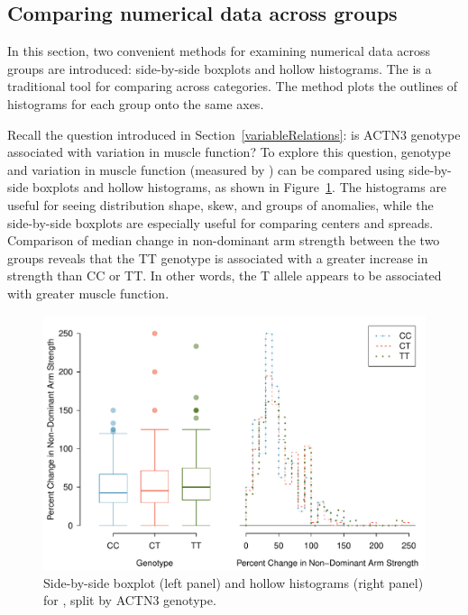 \subsection{Comparing numerical data across groups}
\label{comparingAcrossGroups}
In this section, two convenient methods for examining numerical data across groups are introduced: side-by-side boxplots and hollow histograms. The   is a traditional tool for comparing across categories. The  method plots the outlines of histograms for each group onto the same axes.

Recall the question introduced in Section~\ref{variableRelations}: is ACTN3 genotype associated with variation in muscle function? To explore this question, genotype and variation in muscle function (measured by ) can be compared using side-by-side boxplots and hollow histograms, as shown in Figure~\ref{famussGenoMuscFunc}. The histograms are useful for seeing distribution shape, skew, and groups of anomalies, while the side-by-side boxplots are especially useful for comparing centers and spreads. Comparison of median change in non-dominant arm strength between the two groups reveals that the TT genotype is associated with a greater increase in strength than CC or TT. In other words, the T allele appears to be associated with greater muscle function.

\begin{figure}[h]
   \centering
   \includegraphics[width=\textwidth]{ch_intro_to_data_oi_biostat/figures/famussGenoMuscFunc/famussGenoMuscFunc}
   \caption{Side-by-side boxplot (left panel) and hollow histograms (right panel) for , split by ACTN3 genotype.}
   \label{famussGenoMuscFunc}
\end{figure}

